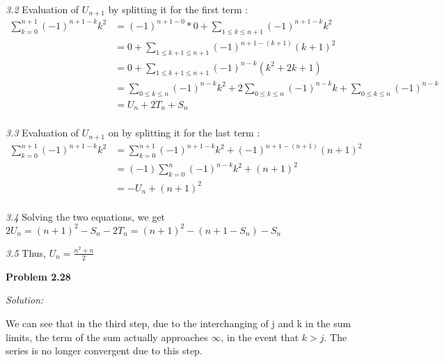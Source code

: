 \documentclass[12pt]{article}
\begin{document}
{\textit {3.2}} Evaluation of $U_{n+1}$ by splitting it for the first term :
\begin{equation}\label{eq6}
                                  \begin{split}
                                     \sum\limits_{k=0} ^{n+1} (-1)^{n+1-k}k^2 & = (-1)^{n+1-0} * 0 + \sum\limits_{1\leq k\leq n+1} (-1)^{n+1-k}k^2\\
                                       & =0 + \sum\limits_{1\leq k+1\leq n+1} (-1)^{n+1-(k+1)}(k+1)^2 \\
                                       & =0 + \sum\limits_{1\leq k+1\leq n+1} (-1)^{n-k}(k^2+2k+1) \\
                                       & =\sum\limits_{0\leq k\leq n} (-1)^{n-k}k^2 + 2\sum\limits_{0\leq k\leq n} (-1)^{n-k}k + \sum\limits_{0\leq k\leq n} (-1)^{n-k}\\
                                       & =U_n+2T_n + S_n\\
                                  \end{split}
                                \end{equation}

{\textit {3.3}} Evaluation of $U_{n+1}$ on by splitting it for the last term :
\begin{equation}\label{eq7}
                                  \begin{split}
                                     \sum\limits_{k=0} ^{n+1} (-1)^{n+1-k}k^2 & = \sum\limits_{k=0} ^{n+1} (-1)^{n+1-k}k^2 + (-1)^{n+1-(n+1)}(n+1)^2\\
                                       & =(-1)\sum\limits_{k=0} ^{n} (-1)^{n-k}k^2 + (n+1)^2 \\
                                       & =-U_n + (n+1)^2\\
                                  \end{split}
                                \end{equation}

{\textit {3.4}} Solving the two equations, we get $2U_n = (n+1)^2 - S_n - 2T_n = (n+1)^2 - (n+1-S_n) - S_n$

{\textit {3.5}} Thus, {\bf $U_n = \frac{n^2+n}{2}$ }

\medskip

\noindent
{\bf Problem 2.28}

\textit {Solution:}

We can see that in the third step, due to the interchanging of j and k in the sum limits, the term of the sum actually approaches $\infty$, in the event that $k>j$. The series is no longer convergent due to this step.
\end{document}
